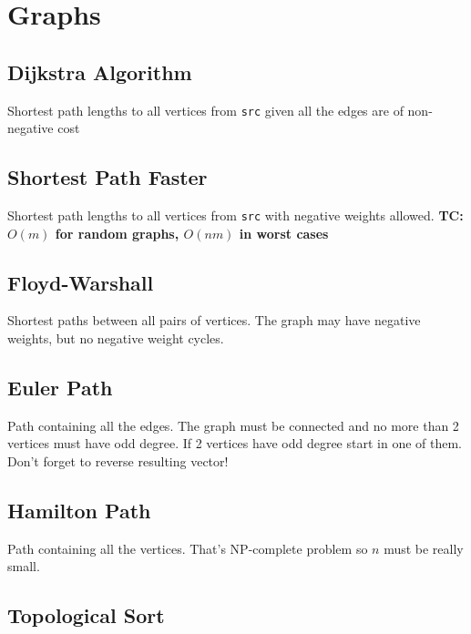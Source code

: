 \pagebreak
\section{Graphs}

\subsection{Dijkstra Algorithm}

Shortest path lengths to all vertices from \verb|src| given all the edges are of non-negative cost


\subsection{Shortest Path Faster}

Shortest path lengths to all vertices from \verb|src| with negative weights allowed.
\bf{TC: } $O(m)$ for random graphs, $O(nm)$ in worst cases

\subsection{Floyd-Warshall}

Shortest paths between all pairs of vertices. The graph may have negative weights, but no negative weight cycles. 

\subsection{Euler Path}

Path containing all the edges. The graph must be connected and no more than 2 vertices must have odd degree. If 2 vertices have odd degree start in one of them. Don't forget to reverse resulting vector!

\subsection{Hamilton Path}

Path containing all the vertices. That's NP-complete problem so $n$ must be really small. 

\subsection{Topological Sort}

